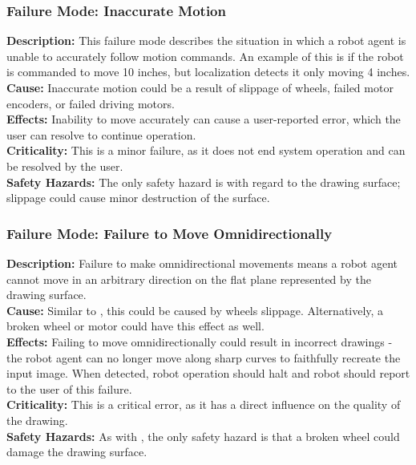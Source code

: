 \subsubsection{Failure Mode: Inaccurate Motion}
\label{sec:locomotion_fm_motion}
\textbf{Description:} This failure mode describes the situation in which a robot agent is unable to accurately follow motion commands. An example of this is if the robot is commanded to move 10 inches, but localization detects it only moving 4 inches.\\
\textbf{Cause:} Inaccurate motion could be a result of slippage of wheels, failed motor encoders, or failed driving motors.\\
\textbf{Effects:} Inability to move accurately can cause a user-reported error, which the user can resolve to continue operation. \\
\textbf{Criticality:}  This is a minor failure, as it does not end system operation and can be resolved by the user.\\
\textbf{Safety Hazards:} The only safety hazard is with regard to the drawing surface; slippage could cause minor destruction of the surface.

\subsubsection{Failure Mode: Failure to Move Omnidirectionally}
\label{sec:locomotion_fm_omni}
\textbf{Description:} Failure to make omnidirectional movements means a robot agent cannot move in an arbitrary direction on the flat plane represented by the drawing surface.\\
\textbf{Cause:} Similar to , this could be caused by wheels slippage. Alternatively, a broken wheel or motor could have this effect as well.\\
\textbf{Effects:} Failing to move omnidirectionally could result in incorrect drawings - the robot agent can no longer move along sharp curves to faithfully recreate the input image. When detected, robot operation should halt and robot should report to the user of this failure.\\
\textbf{Criticality:}  This is a critical error, as it has a direct influence on the quality of the drawing.\\
\textbf{Safety Hazards:} As with , the only safety hazard is that a broken wheel could damage the drawing surface.